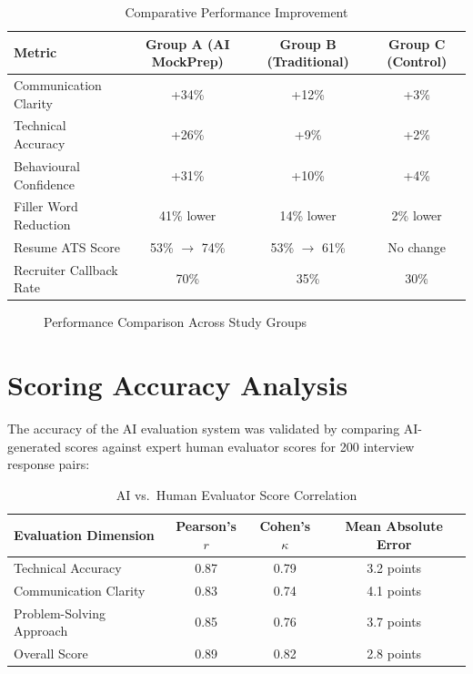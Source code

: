 \documentclass[12pt,a4paper,oneside]{report}
\begin{document}
\begin{table}[H]
\centering
\caption{Comparative Performance Improvement}
\label{tab:comparative_results}
\begin{tabular}{|l|c|c|c|}
\hline
\textbf{Metric} & \textbf{Group A (AI MockPrep)} & \textbf{Group B (Traditional)} & \textbf{Group C (Control)} \\
\hline
Communication Clarity & +34\% & +12\% & +3\% \\
\hline
Technical Accuracy & +26\% & +9\% & +2\% \\
\hline
Behavioural Confidence & +31\% & +10\% & +4\% \\
\hline
Filler Word Reduction & 41\% lower & 14\% lower & 2\% lower \\
\hline
Resume ATS Score & 53\% $\rightarrow$ 74\% & 53\% $\rightarrow$ 61\% & No change \\
\hline
Recruiter Callback Rate & 70\% & 35\% & 30\% \\
\hline
\end{tabular}
\end{table}

\begin{figure}[H]
\centering
{}
\caption{Performance Comparison Across Study Groups}
\label{fig:performance_graph}
\end{figure}


\section{Scoring Accuracy Analysis}

The accuracy of the AI evaluation system was validated by comparing AI-generated scores against expert human evaluator scores for 200 interview response pairs:

\begin{table}[H]
\centering
\caption{AI vs.\ Human Evaluator Score Correlation}
\label{tab:score_accuracy}
\begin{tabular}{|l|c|c|c|}
\hline
\textbf{Evaluation Dimension} & \textbf{Pearson's $r$} & \textbf{Cohen's $\kappa$} & \textbf{Mean Absolute Error} \\
\hline
Technical Accuracy & 0.87 & 0.79 & 3.2 points \\
\hline
Communication Clarity & 0.83 & 0.74 & 4.1 points \\
\hline
Problem-Solving Approach & 0.85 & 0.76 & 3.7 points \\
\hline
Overall Score & 0.89 & 0.82 & 2.8 points \\
\hline
\end{tabular}
\end{table}
\end{document}
